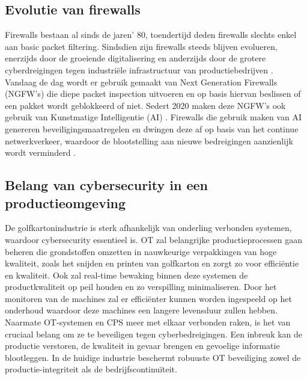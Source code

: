 \subsection{Evolutie van firewalls}
Firewalls bestaan al sinds de jaren’ 80, toendertijd deden firewalls slechts enkel aan basic packet filtering. Sindsdien zijn firewalls steeds blijven evolueren, enerzijds door de groeiende digitalisering en anderzijds door de grotere cyberdreigingen tegen industriële infrastructuur van productiebedrijven \autocite{Wusteney2021}. 
Vandaag de dag wordt er gebruik gemaakt van Next Generation Firewalls (NGFW’s) die diepe packet inspection uitvoeren en op basis hiervan beslissen of een pakket wordt geblokkeerd of niet. Sedert 2020 maken deze NGFW’s ook gebruik van Kunstmatige Intelligentie (AI) \textcite{Ahmadi2023}. Firewalls die gebruik maken van AI genereren beveiligingsmaatregelen en dwingen deze af op basis van het continue netwerkverkeer, waardoor de blootstelling aan nieuwe bedreigingen aanzienlijk wordt verminderd \textcite{PaloAltoFW2024}.

  
\subsection{Belang van cybersecurity in een productieomgeving}

De golfkartonindustrie is sterk afhankelijk van onderling verbonden systemen, waardoor cybersecurity essentieel is. OT zal belangrijke productieprocessen gaan beheren die grondstoffen omzetten in nauwkeurige verpakkingen van hoge kwaliteit, zoals het snijden en printen van golfkarton en zorgt zo voor efficiëntie en kwaliteit. Ook zal real-time bewaking binnen deze systemen de productkwaliteit op peil houden en zo verspilling minimaliseren. Door het monitoren van de machines zal er efficiënter kunnen worden ingespeeld op het onderhoud waardoor deze machines een langere levensduur zullen hebben. Naarmate OT-systemen en CPS meer met elkaar verbonden raken, is het van cruciaal belang om ze te beveiligen tegen cyberbedreigingen. Een inbreuk kan de productie verstoren, de kwaliteit in gevaar brengen en gevoelige informatie blootleggen. In de huidige industrie beschermt robuuste OT beveiliging zowel de productie-integriteit als de bedrijfscontinuïteit. \autocite{fefco2025}

